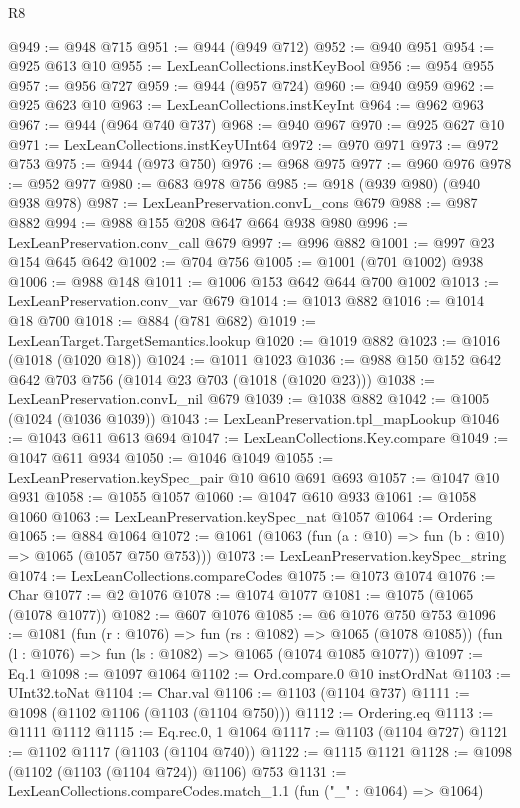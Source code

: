 \begin{lexlean}{R8}
\begin{coremodule}
@949 := @948 @715
@951 := @944 (@949 @712)
@952 := @940 @951
@954 := @925 @613 @10
@955 := LexLeanCollections.instKeyBool
@956 := @954 @955
@957 := @956 @727
@959 := @944 (@957 @724)
@960 := @940 @959
@962 := @925 @623 @10
@963 := LexLeanCollections.instKeyInt
@964 := @962 @963
@967 := @944 (@964 @740 @737)
@968 := @940 @967
@970 := @925 @627 @10
@971 := LexLeanCollections.instKeyUInt64
@972 := @970 @971
@973 := @972 @753
@975 := @944 (@973 @750)
@976 := @968 @975
@977 := @960 @976
@978 := @952 @977
@980 := @683 @978 @756
@985 := @918 (@939 @980) (@940 @938 @978)
@987 := LexLeanPreservation.convL_cons @679
@988 := @987 @882
@994 := @988 @155 @208 @647 @664 @938 @980
@996 := LexLeanPreservation.conv_call @679
@997 := @996 @882
@1001 := @997 @23 @154 @645 @642
@1002 := @704 @756
@1005 := @1001 (@701 @1002) @938
@1006 := @988 @148
@1011 := @1006 @153 @642 @644 @700 @1002
@1013 := LexLeanPreservation.conv_var @679
@1014 := @1013 @882
@1016 := @1014 @18 @700
@1018 := @884 (@781 @682)
@1019 := LexLeanTarget.TargetSemantics.lookup
@1020 := @1019 @882
@1023 := @1016 (@1018 (@1020 @18))
@1024 := @1011 @1023
@1036 := @988 @150 @152 @642 @642 @703 @756 (@1014 @23 @703 (@1018 (@1020 @23)))
@1038 := LexLeanPreservation.convL_nil @679
@1039 := @1038 @882
@1042 := @1005 (@1024 (@1036 @1039))
@1043 := LexLeanPreservation.tpl_mapLookup
@1046 := @1043 @611 @613 @694
@1047 := LexLeanCollections.Key.compare
@1049 := @1047 @611 @934
@1050 := @1046 @1049
@1055 := LexLeanPreservation.keySpec_pair @10 @610 @691 @693
@1057 := @1047 @10 @931
@1058 := @1055 @1057
@1060 := @1047 @610 @933
@1061 := @1058 @1060
@1063 := LexLeanPreservation.keySpec_nat @1057
@1064 := Ordering
@1065 := @884 @1064
@1072 := @1061 (@1063 (fun (a : @10) => fun (b : @10) => @1065 (@1057 @750 @753)))
@1073 := LexLeanPreservation.keySpec_string
@1074 := LexLeanCollections.compareCodes
@1075 := @1073 @1074
@1076 := Char
@1077 := @2 @1076
@1078 := @1074 @1077
@1081 := @1075 (@1065 (@1078 @1077))
@1082 := @607 @1076
@1085 := @6 @1076 @750 @753
@1096 := @1081
    (fun (r : @1076) => fun (rs : @1082) => @1065 (@1078 @1085))
    (fun (l : @1076) => fun (ls : @1082) => @1065 (@1074 @1085 @1077))
@1097 := Eq.{1}
@1098 := @1097 @1064
@1102 := Ord.compare.{0} @10 instOrdNat
@1103 := UInt32.toNat
@1104 := Char.val
@1106 := @1103 (@1104 @737)
@1111 := @1098 (@1102 @1106 (@1103 (@1104 @750)))
@1112 := Ordering.eq
@1113 := @1111 @1112
@1115 := Eq.rec.{0, 1} @1064
@1117 := @1103 (@1104 @727)
@1121 := @1102 @1117 (@1103 (@1104 @740))
@1122 := @1115 @1121
@1128 := @1098 (@1102 (@1103 (@1104 @724)) @1106) @753
@1131 := LexLeanCollections.compareCodes.match_1.{1} (fun ("_" : @1064) => @1064)

\end{coremodule}
\end{lexlean}
